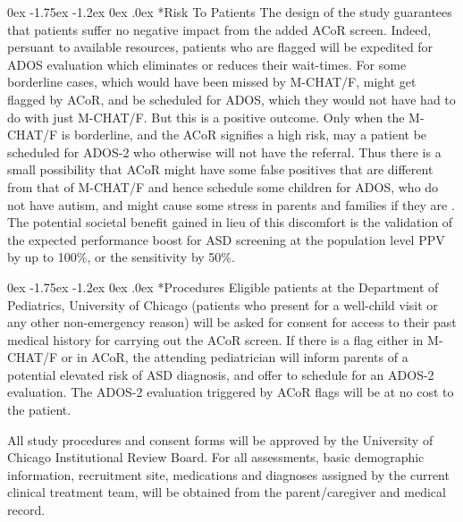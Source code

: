 \documentclass[onecolumn, compsoc,11pt]{IEEEtran}
\makeatletter
\renewcommand\subsection{\@startsection {subsection}{2}{\z@}%
                                   {0ex \@plus -1.75ex \@minus -1.2ex}%
                                   {0ex \@plus.0ex}%
                                   {\fontsize{11}{11}\selectfont\bfseries\sffamily\color{black}}}
\def\ZERO{ACoR\xspace}
\makeatother
\begin{document}
\subsection*{Risk To Patients} The design of the study guarantees that patients suffer no negative impact from the added \ZERO screen. Indeed, persuant to available resources, patients who are flagged will  be expedited for ADOS evaluation which eliminates or reduces their wait-times. For some borderline cases, which would have been missed by M-CHAT/F, might get flagged by \ZERO, and be scheduled for ADOS, which they would not have had to do with just M-CHAT/F. But this is a positive outcome. Only when the M-CHAT/F is borderline, and the \ZERO signifies a high risk, may a patient be scheduled for ADOS-2 who otherwise will not have the referral. Thus there is a small possibility  that \ZERO might have some false positives that are different from that of M-CHAT/F and hence schedule some children for ADOS, who do not have autism, and might cause some stress in parents and families if they are . The potential societal benefit gained in lieu of this discomfort is the validation of the expected  performance boost for ASD screening at the population level PPV by up to 100\%, or the sensitivity by 50\%.

\subsection*{Procedures} Eligible patients at the Department of Pediatrics, University of Chicago (patients who present for a well-child visit or any other non-emergency reason) will be asked  for consent for access to their past medical history for carrying out the \ZERO screen. %
If there is a flag either in M-CHAT/F or in \ZERO, the attending pediatrician will inform parents of a potential elevated risk of ASD diagnosis, and offer to schedule for an ADOS-2 evaluation. The ADOS-2 evaluation triggered by \ZERO flags will be at no cost to the patient.

All study procedures and consent forms will be approved by the University of Chicago Institutional Review Board.  For all assessments, basic demographic information, recruitment site, medications and diagnoses assigned by the current clinical treatment team, will be obtained from the parent/caregiver and medical record.
\end{document}
